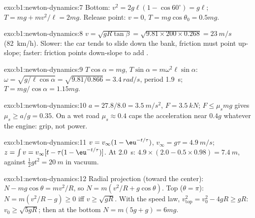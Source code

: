 \begin{solution}{exo:b1:newton-dynamics:7}
Bottom: $v^2 = 2g\ell(1 - \cos 60^\circ) = g\ell$; $T = mg + mv^2/\ell =
2mg$. Release point: $v = 0$, $T = mg\cos\theta_0 = 0.5mg$.
\end{solution}

\begin{solution}{exo:b1:newton-dynamics:8}
$v = \sqrt{gR\tan\beta} = \sqrt{9.81 \times 200 \times 0.268} = \qty{23}{m/s}$
(\qty{82}{km/h}). Slower: the car tends to slide down the bank, friction
must point up-slope; faster: friction points down-slope to add
.
\end{solution}

\begin{solution}{exo:b1:newton-dynamics:9}
$T\cos\alpha = mg$, $T\sin\alpha = m\omega^2\ell\sin\alpha$: $\omega =
\sqrt{g/\ell\cos\alpha} = \sqrt{9.81/0.866} = \qty{3.4}{rad/s}$, period
\qty{1.9}{s}; $T = mg/\cos\alpha = 1.15mg$.
\end{solution}

\begin{solution}{exo:b1:newton-dynamics:10}
$a = 27.8/8.0 = \qty{3.5}{m/s^2}$, $F = \qty{3.5}{kN}$; $F \leq \mu_smg$
gives $\mu_s \geq a/g = 0.35$. On a wet road $\mu_s \approx 0.4$ caps the
acceleration near $0.4g$ whatever the engine: grip, not power.
\end{solution}

\begin{solution}{exo:b1:newton-dynamics:11}
$v = v_\infty(1 - \eu^{-t/\tau})$, $v_\infty = g\tau = \qty{4.9}{m/s}$;
$z = \int v = v_\infty[t - \tau(1 - \eu^{-t/\tau})]$. At \qty{2.0}{s}:
$4.9 \times (2.0 - 0.5 \times 0.98) = \qty{7.4}{m}$, against $\tfrac12 gt^2
= \qty{20}{m}$ in vacuum.
\end{solution}

\begin{solution}{exo:b1:newton-dynamics:12}
Radial projection (toward the center): $N - mg\cos\theta = mv^2/R$, so
$N = m(v^2/R + g\cos\theta)$. Top ($\theta = \pi$): $N = m(v^2/R - g)
\geq 0$ iff $v \geq \sqrt{gR}$. With the speed law, $v_{\text{top}}^2 =
v_0^2 - 4gR \geq gR$: $v_0 \geq \sqrt{5gR}$; then at the bottom $N =
m(5g + g) = 6mg$.
\end{solution}

